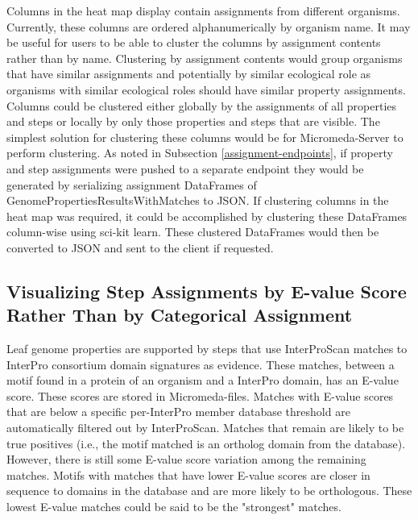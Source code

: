 Columns in the heat map display contain assignments from different organisms. Currently, these columns are ordered alphanumerically by organism name. It may be useful for users to be able to cluster the columns by assignment contents rather than by name. Clustering by assignment contents would group organisms that have similar assignments and potentially by similar ecological role as organisms with similar ecological roles should have similar property assignments. Columns could be clustered either globally by the assignments of all properties and steps or locally by only those properties and steps that are visible. The simplest solution for clustering these columns would be for Micromeda-Server to perform clustering. As noted in Subsection \ref{assignment-endpoints}, if property and step assignments were pushed to a separate endpoint they would be generated by serializing assignment DataFrames of GenomePropertiesResultsWithMatches to JSON. If clustering columns in the heat map was required, it could be accomplished by clustering these DataFrames column-wise using sci-kit learn. These clustered DataFrames would then be converted to JSON and sent to the client if requested.

\subsection{Visualizing Step Assignments by E-value Score Rather Than by Categorical Assignment}

Leaf genome properties are supported by steps that use InterProScan matches to InterPro consortium domain signatures as evidence. These matches, between a motif found in a protein of an organism and a InterPro domain, has an E-value score. These scores are stored in Micromeda-files. Matches with E-value scores that are below a specific per-InterPro member database threshold are automatically filtered out by InterProScan. Matches that remain are likely to be true positives (i.e., the motif matched is an ortholog domain from the database). However, there is still some E-value score variation among the remaining matches. Motifs with matches that have lower E-value scores are closer in sequence to domains in the database and are more likely to be orthologous. These lowest E-value matches could be said to be the "strongest" matches.

